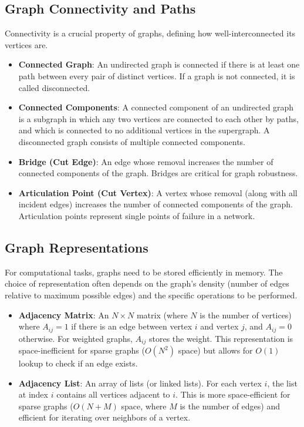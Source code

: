 \documentclass[11pt, a4paper]{article}
\begin{document}
\subsection{Graph Connectivity and Paths}
Connectivity is a crucial property of graphs, defining how well-interconnected its vertices are.
\begin{itemize}[noitemsep,topsep=3pt,parsep=3pt,partopsep=0pt]
    \item \textbf{Connected Graph}: An undirected graph is connected if there is at least one path between every pair of distinct vertices. If a graph is not connected, it is called disconnected.
    \item \textbf{Connected Components}: A connected component of an undirected graph is a subgraph in which any two vertices are connected to each other by paths, and which is connected to no additional vertices in the supergraph. A disconnected graph consists of multiple connected components.
    \item \textbf{Bridge (Cut Edge)}: An edge whose removal increases the number of connected components of the graph. Bridges are critical for graph robustness.
    \item \textbf{Articulation Point (Cut Vertex)}: A vertex whose removal (along with all incident edges) increases the number of connected components of the graph. Articulation points represent single points of failure in a network.
\end{itemize}

\subsection{Graph Representations}
For computational tasks, graphs need to be stored efficiently in memory. The choice of representation often depends on the graph's density (number of edges relative to maximum possible edges) and the specific operations to be performed.
\begin{itemize}[noitemsep,topsep=3pt,parsep=3pt,partopsep=0pt]
    \item \textbf{Adjacency Matrix}: An $N \times N$ matrix (where $N$ is the number of vertices) where $A_{ij}=1$ if there is an edge between vertex $i$ and vertex $j$, and $A_{ij}=0$ otherwise. For weighted graphs, $A_{ij}$ stores the weight. This representation is space-inefficient for sparse graphs ($O(N^2)$ space) but allows for $O(1)$ lookup to check if an edge exists.
    \item \textbf{Adjacency List}: An array of lists (or linked lists). For each vertex $i$, the list at index $i$ contains all vertices adjacent to $i$. This is more space-efficient for sparse graphs ($O(N+M)$ space, where $M$ is the number of edges) and efficient for iterating over neighbors of a vertex.
\end{itemize}
\end{document}
